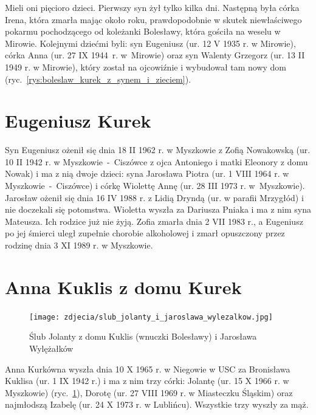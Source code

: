 Mieli oni pięcioro dzieci. Pierwszy syn żył tylko kilka dni. Następną była córka Irena, która zmarła mając około roku, prawdopodobnie w skutek niewłaściwego pokarmu pochodzącego od koleżanki Bolesławy, która gościła na weselu w Mirowie.
Kolejnymi dziećmi byli: syn Eugeniusz (ur. 12 V 1935 r. w Mirowie), córka Anna (ur. 27 IX 1944~r. w~Mirowie) oraz syn Walenty Grzegorz (ur. 13 II 1949 r. w Mirowie), który został na ojcowiźnie i wybudował tam nowy dom (ryc.~\ref{rys:boleslaw_kurek_z_synem_i_zieciem}).



\section{Eugeniusz Kurek}

Syn Eugeniusz ożenił się dnia 18 II 1962 r. w Myszkowie z Zofią Nowakowską (ur. 10 II 1942 r. w Myszkowie~-~Ciszówce z ojca Antoniego i matki Eleonory z domu Nowak) i ma z nią dwoje dzieci: syna Jarosława Piotra (ur. 1 VIII 1964 r. w Myszkowie~-~Ciszówce) i córkę Wiolettę Annę (ur. 28 III 1973 r. w~Myszkowie). Jarosław ożenił się dnia 16 IV 1988 r. z Lidią Dryndą (ur. w parafii Mrzygłód) i nie doczekali się potomstwa. Wioletta wyszła za Dariusza Pniaka i ma z nim syna Mateusza. Ich rodzice już nie żyją. Zofia zmarła dnia 2 VII 1983 r., a Eugeniusz po jej śmierci uległ zupełnie chorobie alkoholowej i zmarł opuszczony przez rodzinę dnia 3 XI 1989 r. w Myszkowie.




\section{Anna Kuklis z domu Kurek}

\begin{figure}[!h]
\begin{center}
\texttt{[image: zdjecia/slub\_jolanty\_i\_jaroslawa\_wylezalkow.jpg]}
\caption[Ślub Jolanty Kuklis z Jarosławem Wylężałkiem]{Ślub Jolanty z domu Kuklis (wnuczki Bolesławy) i Jarosława Wylężałków}
\label{rys:slub_jolanty_i_jaroslawa_wylezalkow}
\end{center}
\end{figure}

Anna Kurkówna wyszła dnia 10 X 1965 r. w Niegowie w USC za Bronisława Kuklisa (ur. 1 IX 1942 r.) i ma z nim trzy córki: Jolantę (ur. 15 X 1966 r. w Myszkowie) (ryc.~\ref{rys:slub_jolanty_i_jaroslawa_wylezalkow}), Dorotę (ur. 27 VIII 1969 r. w Miasteczku Śląskim) oraz najmłodszą Izabelę (ur. 24 X 1973 r. w Lublińcu). Wszystkie trzy wyszły za mąż.


